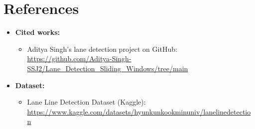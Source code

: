 \documentclass[12pt,a4paper]{article}
\begin{document}
\section{References}

\begin{itemize}
    \item \textbf{Cited works:}  
    \begin{itemize}
        \item Aditya Singh's lane detection project on GitHub: 
        \href{https://github.com/Aditya-Singh-SSJ2/Lane_Detection_Sliding_Windows/tree/main}{https://github.com/Aditya-Singh-SSJ2/Lane\_Detection\_Sliding\_Windows/tree/main}
    \end{itemize}
    \item \textbf{Dataset:}  
    \begin{itemize}
        \item Lane Line Detection Dataset (Kaggle): \url{https://www.kaggle.com/datasets/hyunkunkookminuniv/lanelinedetection}
    \end{itemize}
\end{itemize}
\end{document}

